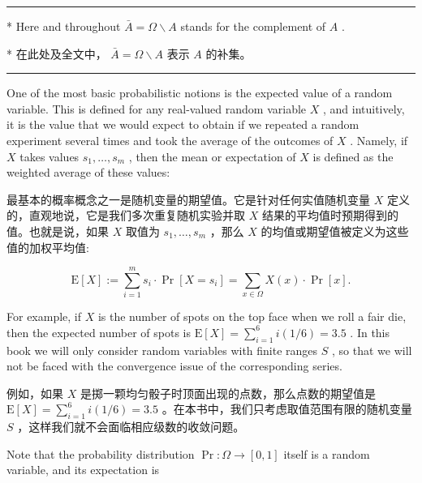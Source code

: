 \documentclass[10pt]{article}
\newcommand{\HRule}{\begin{center}\rule{0.9\linewidth}{0.2mm}\end{center}}
\begin{document}
\HRule

* Here and throughout \(\bar{A} = \Omega  \smallsetminus  A\) stands for the complement of \(A\) .

\begin{tcolorbox}\relax
* 在此处及全文中， \(\bar{A} = \Omega  \smallsetminus  A\) 表示 \(A\) 的补集。
\end{tcolorbox}

\HRule

One of the most basic probabilistic notions is the expected value of a random variable. This is defined for any real-valued random variable \(X\) , and intuitively, it is the value that we would expect to obtain if we repeated a random experiment several times and took the average of the outcomes of \(X\) . Namely, if \(X\) takes values \({s}_{1},\ldots ,{s}_{m}\) , then the mean or expectation of \(X\) is defined as the weighted average of these values:

\begin{tcolorbox}\relax
最基本的概率概念之一是随机变量的期望值。它是针对任何实值随机变量 \(X\) 定义的，直观地说，它是我们多次重复随机实验并取 \(X\) 结果的平均值时预期得到的值。也就是说，如果 \(X\) 取值为 \({s}_{1},\ldots ,{s}_{m}\) ，那么 \(X\) 的均值或期望值被定义为这些值的加权平均值:
\end{tcolorbox}

\[
\mathrm{E}\left\lbrack  X\right\rbrack   \mathrel{\text{ := }} \mathop{\sum }\limits_{{i = 1}}^{m}{s}_{i} \cdot  \Pr \left\lbrack  {X = {s}_{i}}\right\rbrack   = \mathop{\sum }\limits_{{x \in  \Omega }}X\left( x\right)  \cdot  \Pr \left\lbrack  x\right\rbrack  .
\]

For example, if \(X\) is the number of spots on the top face when we roll a fair die, then the expected number of spots is \(\mathrm{E}\left\lbrack  X\right\rbrack   = \mathop{\sum }\limits_{{i = 1}}^{6}i\left( {1/6}\right)  = {3.5}\) . In this book we will only consider random variables with finite ranges \(S\) , so that we will not be faced with the convergence issue of the corresponding series.

\begin{tcolorbox}\relax
例如，如果 \(X\) 是掷一颗均匀骰子时顶面出现的点数，那么点数的期望值是 \(\mathrm{E}\left\lbrack  X\right\rbrack   = \mathop{\sum }\limits_{{i = 1}}^{6}i\left( {1/6}\right)  = {3.5}\) 。在本书中，我们只考虑取值范围有限的随机变量 \(S\) ，这样我们就不会面临相应级数的收敛问题。
\end{tcolorbox}

Note that the probability distribution \(\Pr  : \Omega  \rightarrow  \left\lbrack  {0,1}\right\rbrack\) itself is a random variable, and its expectation is
\end{document}
